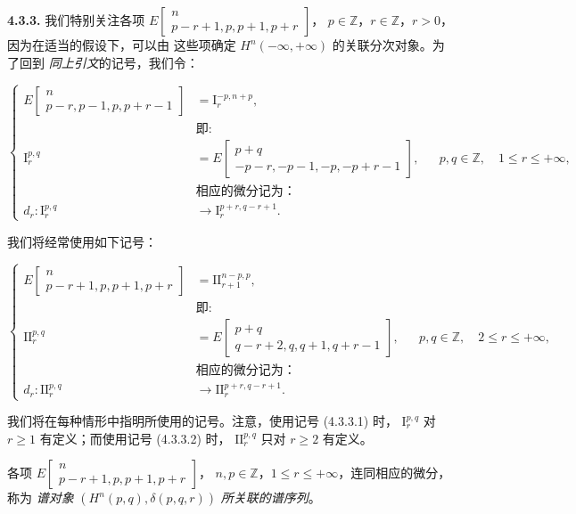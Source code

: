 \clearpage
{}%
\begingroup\small\setlength{\parskip}{0pt}\setlength{\emergencystretch}{1.5em}
\medskip\noindent\textbf{4.3.3.}\quad
我们特别关注各项
$E\!\left[\begin{smallmatrix}n\\p-r+1,p,p+1,p+r\end{smallmatrix}\right]$，
$p\in\mathbb Z$，$r\in\mathbb Z$，$r>0$，因为在适当的假设下，可以由
这些项确定 $H^n(-\infty,+\infty)$ 的关联分次对象。为了回到
\emph{同上引文}的记号，我们令：

\[
\left\{
\begin{aligned}
E\!\left[\begin{smallmatrix}n\\p-r,p-1,p,p+r-1\end{smallmatrix}\right]
  &=\mathrm I_r^{-p,n+p},\\
&\textit{即}:\\[-2pt]
\mathrm I_r^{p,q}
  &=E\!\left[\begin{smallmatrix}p+q\\-p-r,-p-1,-p,-p+r-1\end{smallmatrix}\right],
  &&p,q\in\mathbb Z,\quad 1\leq r\leq+\infty,\\
&\text{相应的微分记为：}\\[-2pt]
d_r\colon\mathrm I_r^{p,q}&\longrightarrow
  \mathrm I_r^{p+r,q-r+1}.
\end{aligned}
\right.
\tag{4.3.3.1}
\]

我们将经常使用如下记号：

\[
\left\{
\begin{aligned}
E\!\left[\begin{smallmatrix}n\\p-r+1,p,p+1,p+r\end{smallmatrix}\right]
  &=\mathrm{II}_{r+1}^{n-p,p},\\
&\textit{即}:\\[-2pt]
\mathrm{II}_r^{p,q}
  &=E\!\left[\begin{smallmatrix}p+q\\q-r+2,q,q+1,q+r-1\end{smallmatrix}\right],
  &&p,q\in\mathbb Z,\quad 2\leq r\leq+\infty,\\
&\text{相应的微分记为：}\\[-2pt]
d_r\colon\mathrm{II}_r^{p,q}&\longrightarrow
  \mathrm{II}_r^{p+r,q-r+1}.
\end{aligned}
\right.
\tag{4.3.3.2}
\]

我们将在每种情形中指明所使用的记号。注意，使用记号 (4.3.3.1) 时，
$\mathrm I_r^{p,q}$ 对 $r\geq1$ 有定义；而使用记号 (4.3.3.2) 时，
$\mathrm{II}_r^{p,q}$ 只对 $r\geq2$ 有定义。

各项
$E\!\left[\begin{smallmatrix}n\\p-r+1,p,p+1,p+r\end{smallmatrix}\right]$，
$n,p\in\mathbb Z$，$1\leq r\leq+\infty$，连同相应的微分，称为
\emph{谱对象} $(H^n(p,q),\delta(p,q,r))$ \emph{所关联的谱序列}。
\endgroup
